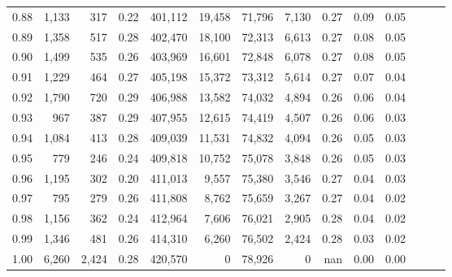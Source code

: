 \begin{tabular}{rrrrrrrrrrrrrr}
0.88 &   1,133 &    317 &  0.22 &  401,112 &   19,458 &  71,796 &   7,130 &  0.27 &  0.09 &      0.05 \\
0.89 &   1,358 &    517 &  0.28 &  402,470 &   18,100 &  72,313 &   6,613 &  0.27 &  0.08 &      0.05 \\
0.90 &   1,499 &    535 &  0.26 &  403,969 &   16,601 &  72,848 &   6,078 &  0.27 &  0.08 &      0.05 \\
0.91 &   1,229 &    464 &  0.27 &  405,198 &   15,372 &  73,312 &   5,614 &  0.27 &  0.07 &      0.04 \\
0.92 &   1,790 &    720 &  0.29 &  406,988 &   13,582 &  74,032 &   4,894 &  0.26 &  0.06 &      0.04 \\
0.93 &     967 &    387 &  0.29 &  407,955 &   12,615 &  74,419 &   4,507 &  0.26 &  0.06 &      0.03 \\
0.94 &   1,084 &    413 &  0.28 &  409,039 &   11,531 &  74,832 &   4,094 &  0.26 &  0.05 &      0.03 \\
0.95 &     779 &    246 &  0.24 &  409,818 &   10,752 &  75,078 &   3,848 &  0.26 &  0.05 &      0.03 \\
0.96 &   1,195 &    302 &  0.20 &  411,013 &    9,557 &  75,380 &   3,546 &  0.27 &  0.04 &      0.03 \\
0.97 &     795 &    279 &  0.26 &  411,808 &    8,762 &  75,659 &   3,267 &  0.27 &  0.04 &      0.02 \\
0.98 &   1,156 &    362 &  0.24 &  412,964 &    7,606 &  76,021 &   2,905 &  0.28 &  0.04 &      0.02 \\
0.99 &   1,346 &    481 &  0.26 &  414,310 &    6,260 &  76,502 &   2,424 &  0.28 &  0.03 &      0.02 \\
1.00 &   6,260 &  2,424 &  0.28 &  420,570 &        0 &  78,926 &       0 &   nan &  0.00 &      0.00 \\
\bottomrule
\end{tabular}
